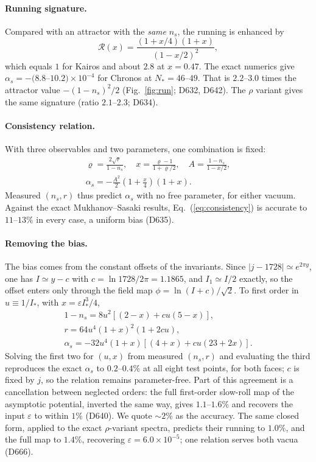 \documentclass[aps,prd,twocolumn,superscriptaddress,nofootinbib,floatfix]{revtex4-2}
\begin{document}
\paragraph{Running signature.} Compared with an attractor with the \emph{same} $n_s$, the running is enhanced by
\begin{equation}
\mathcal{R}(x) = \frac{(1+x/4)(1+x)}{(1-x/2)^2},
\end{equation}
which equals $1$ for Kairos and about $2.8$ at $x = 0.47$. The exact numerics give $\alpha_s = -(8.8$--$10.2)\times10^{-4}$ for Chronos at $N_*=46$--$49$. That is $2.2$--$3.0$ times the attractor value $-(1-n_s)^2/2$ (Fig.~\ref{fig:run}; D632, D642). The $\rho$ variant gives the same signature (ratio $2.1$--$2.3$; D634).

\paragraph{Consistency relation.} With three observables and two parameters, one combination is fixed:
\begin{gather}
\varrho = \frac{2\sqrt r}{1-n_s},\quad x = \frac{\varrho-1}{1+\varrho/2},\quad A = \frac{1-n_s}{1-x/2}, \nonumber\\
\alpha_s = -\frac{A^2}{2}\left(1+\frac{x}{4}\right)(1+x).
\label{eq:consistency}
\end{gather}
Measured $(n_s, r)$ thus predict $\alpha_s$ with no free parameter, for either vacuum. Against the exact Mukhanov--Sasaki results, Eq.~(\ref{eq:consistency}) is accurate to $11$--$13\%$ in every case, a uniform bias (D635).

\paragraph{Removing the bias.} The bias comes from the constant offsets of the invariants. Since $|j-1728|\simeq e^{2\pi y}$, one has $I\simeq y-c$ with $c=\ln1728/2\pi=1.1865$, and $I_1\simeq I/2$ exactly, so the offset enters only through the field map $\phi=\ln(I+c)/\sqrt2$. To first order in $u\equiv1/I_*$, with $x=\varepsilon I_*^3/4$,
\begin{gather}
1-n_s = 8u^2\left[(2-x)+cu(5-x)\right], \nonumber\\ r = 64u^4(1+x)^2(1+2cu), \nonumber\\
\alpha_s = -32u^4(1+x)\left[(4+x)+cu(23+2x)\right].
\label{eq:consistency2}
\end{gather}
Solving the first two for $(u,x)$ from measured $(n_s,r)$ and evaluating the third reproduces the exact $\alpha_s$ to $0.2$--$0.4\%$ at all eight test points, for both faces; $c$ is fixed by $j$, so the relation remains parameter-free. Part of this agreement is a cancellation between neglected orders: the full first-order slow-roll map of the asymptotic potential, inverted the same way, gives $1.1$--$1.6\%$ and recovers the input $\varepsilon$ to within $1\%$ (D640). We quote $\sim2\%$ as the accuracy. The same closed form, applied to the exact $\rho$-variant spectra, predicts their running to $1.0\%$, and the full map to $1.4\%$, recovering $\varepsilon=6.0\times10^{-5}$; one relation serves both vacua (D666).
\end{document}
